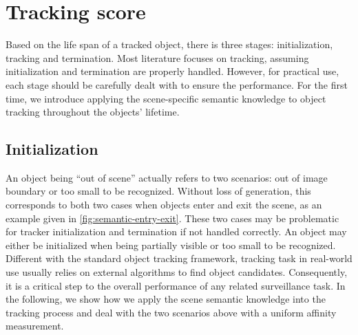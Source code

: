 \section{Tracking score}
Based on the life span of a tracked object, there is three stages: initialization, tracking and termination. 
Most literature focuses on tracking, assuming initialization and termination are properly handled.
However, for practical use, each stage should be carefully dealt with to ensure the performance. 
For the first time, we introduce applying the scene-specific semantic knowledge to object tracking throughout the objects' lifetime. 
\subsection{Initialization}     
    An object being ``out of scene'' actually refers to two scenarios: out of image boundary or too small to be recognized. Without loss of generation, this corresponds to both two cases when objects enter and exit the scene, as an example given in \ref{fig:semantic-entry-exit}. 
    These two cases may be problematic for tracker initialization and termination if not handled correctly. An object may either be initialized when being partially visible or too small to be recognized. 
    Different with the standard object tracking framework, tracking task in real-world use usually relies on external algorithms to find object candidates. Consequently, it is a critical step to the overall performance of any related surveillance task.
    In the following, we show how we apply the scene semantic knowledge into the tracking process and deal with the two scenarios above with a uniform affinity measurement. 

    
    
